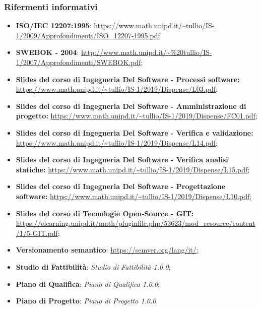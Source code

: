 \subsubsection{Rifermenti informativi}
\begin{itemize}
  \item \textbf{ISO/IEC 12207:1995}: \url{https://www.math.unipd.it/~tullio/IS-1/2009/Approfondimenti/ISO_12207-1995.pdf}
  \item \textbf{SWEBOK - 2004}: \url{http://www.math.unipd.it/~\%20tullio/IS-1/2007/Approfondimenti/SWEBOK.pdf};
  \item \textbf{Slides del corso di Ingegneria Del Software - Processi software:} \url{https://www.math.unipd.it/~tullio/IS-1/2019/Dispense/L03.pdf};
  \item \textbf{Slides del corso di Ingegneria Del Software - Amministrazione di progetto:} \url{https://www.math.unipd.it/~tullio/IS-1/2019/Dispense/FC01.pdf};
  \item \textbf{Slides del corso di Ingegneria Del Software - Verifica e validazione:} \url{https://www.math.unipd.it/~tullio/IS-1/2019/Dispense/L14.pdf};
  \item \textbf{Slides del corso di Ingegneria Del Software - Verifica analisi statiche:} \url{https://www.math.unipd.it/~tullio/IS-1/2019/Dispense/L15.pdf};
  \item \textbf{Slides del corso di Ingegneria Del Software - Progettazione software:}
  \url{  https://www.math.unipd.it/~tullio/IS-1/2019/Dispense/L10.pdf};
  \item \textbf{Slides del corso di Tecnologie Open-Source - GIT:}   \url{  https://elearning.unipd.it/math/pluginfile.php/53623/mod_resource/content/1/5-GIT.pdf};
  \item \textbf{Versionamento semantico}: \url{https://semver.org/lang/it/;}
  \item \textbf{Studio di Fattibilità}: \textit{Studio di Fattibilità 1.0.0\docs};
  \item \textbf{Piano di Qualifica}: \textit{Piano di Qualifica 1.0.0\docs};
  \item \textbf{Piano di Progetto}: \textit{Piano di Progetto 1.0.0\docs}.
\end{itemize}
